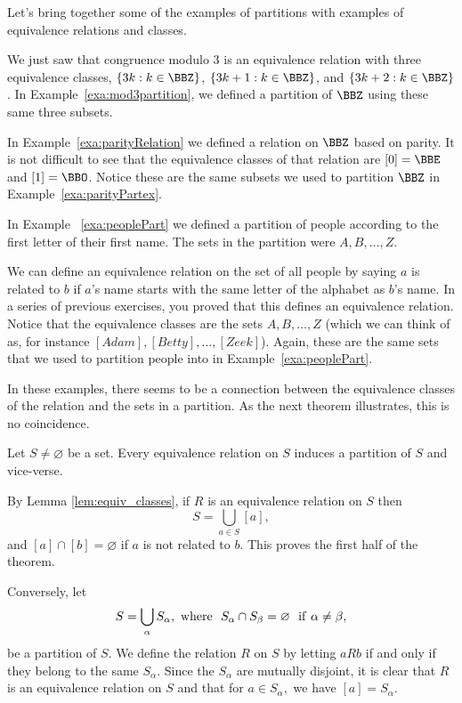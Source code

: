 Let's bring together some of the examples of partitions with examples of equivalence
relations and classes.

\begin{exa}
We just saw that congruence modulo $3$ is an equivalence relation with three
equivalence classes,  $\{3k : k\in\BBZ\}$, $\{3k+1 : k\in\BBZ\}$, and $\{3k+2 : k\in\BBZ\}$.
In Example~\ref{exa:mod3partition}, we defined a partition of $\BBZ$ using these same
three subsets.
\end{exa}

\begin{exa}
In Example~\ref{exa:parityRelation} we defined a relation on $\BBZ$ based on parity.
It is not difficult to see that the equivalence classes of that relation are $[0]=\BBE$
and $[1]=\BBO$.  Notice these are the same subsets we used to partition $\BBZ$ in 
Example~\ref{exa:parityPartex}.
\end{exa}

\begin{exa}
In Example ~\ref{exa:peoplePart} we defined a partition of people according to the first
letter of their first name.  The sets in the partition were $A, B, \ldots, Z$.

We can define an equivalence relation on the set of all people by saying $a$ is related to $b$ if
$a$'s name starts with the same letter of the alphabet as $b$'s name.
In a series of previous exercises, you proved that this defines an equivalence relation.
Notice that the equivalence classes are the sets $A, B, \ldots, Z$ 
(which we can think of as, for instance $[Adam], [Betty], \ldots, [Zeek]$).
Again, these are the same sets that we used to partition people into in Example~\ref{exa:peoplePart}.
\end{exa}

In these examples, there seems to be a connection between the equivalence classes of the 
relation and the sets in a partition.  As the next theorem illustrates, this is no coincidence.  


\begin{thm}\label{thm:equivPart}
Let $S \neq \varnothing$ be a set. Every equivalence
relation on $S$ induces a partition of $S$ and vice-verse. 
\label{thm:equiv_relation_yields_partition}
\begin{pf}
By Lemma \ref{lem:equiv_classes}, if $R$ is an equivalence
relation on $S$ then
$$ S = \bigcup _{a\in S} [a],$$ and $[a]\cap [b] = \varnothing$ if $a$ is not related to $b$.
This proves the first half of the theorem.

Conversely, let $$ S = \bigcup _{\alpha} S_\alpha, \  \mbox{where}\ \
S_\alpha \cap S_\beta = \varnothing\ \ {\rm if}\ \alpha \neq
\beta,$$ be a partition of $S$. We define the relation
$R$ on $S$ by letting $a R b$ if and only if
they belong to the same $S_\alpha$. Since the $S_\alpha$ are
mutually disjoint, it is clear that $R$ is an equivalence
relation on $S$ and that for $a\in S_\alpha,$ we have
$[a] = S_\alpha$.
\end{pf}
\end{thm}

